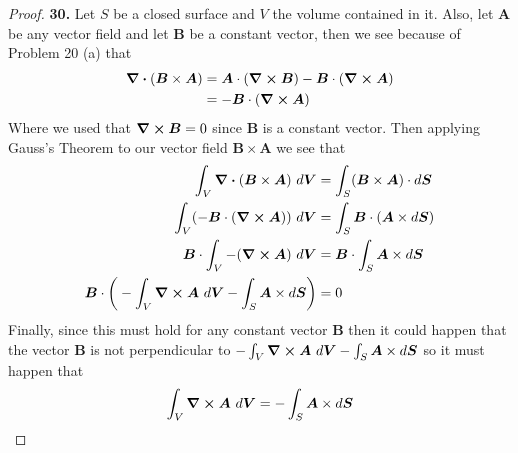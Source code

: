 \documentclass[11pt]{article}
\theoremstyle{definition}
\begin{document}
\begin{proof}{\textbf{30.}}
    Let $S$ be a closed surface and $V$ the volume contained in it.
    Also, let $\bm{A}$ be any vector field and let $\bm{B}$ be a
    constant vector, then we see because of Problem 20 (a) that
    \begin{align*}
        \div (\bm{B} \times \bm{A}) &= \bm{A} \cdot (\curl\bm{B})
            - \bm{B} \cdot (\curl\bm{A}) \\
            &= - \bm{B} \cdot (\curl\bm{A})
    \end{align*}
    Where we used that $\curl\bm{B} = 0$ since $\bm{B}$ is a constant vector.
    Then applying Gauss's Theorem to our vector field $\bm{B \times A}$
    we see that
    \begin{align*}
        \int_V \div (\bm B\times \bm A)~d\bm{V}
        &= \int_S (\bm B\times \bm A)\cdot d\bm{S}\\
        \int_V (- \bm{B} \cdot (\curl\bm{A}))~d\bm{V}
        &= \int_S \bm B \cdot( \bm A \times d\bm{S})\\
        \bm{B} \cdot \int_V -(\curl\bm{A})~d\bm{V}
        &= \bm{B} \cdot \int_S  \bm A \times d\bm{S}\\
        \bm{B} \cdot\bigg(
            -\int_V \curl\bm{A}~d\bm{V} -\int_S  \bm A \times d\bm{S}
        \bigg) &= 0
    \end{align*}
    Finally, since this must hold for any constant vector $\bm{B}$ then it
    could happen that the vector $\bm{B}$ is not perpendicular to
    $-\int_V\curl\bm{A}~d\bm{V} -\int_S  \bm A \times d\bm{S}$
    so it must happen that
    \begin{align*}
        \int_V \curl\bm{A}~d\bm{V}
        &= -\int_S  \bm A \times d\bm{S}\\
    \end{align*}
\end{proof}
\cleardoublepage
\end{document}
